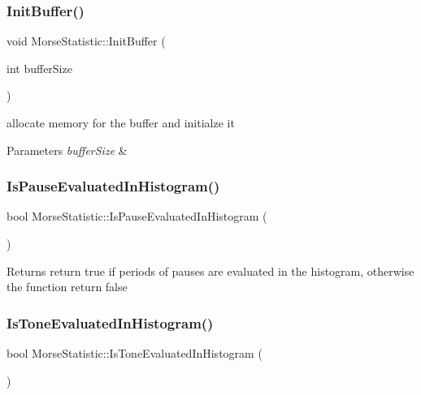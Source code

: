 \subsubsection{\texorpdfstring{Init\+Buffer()}{InitBuffer()}}
{\footnotesize\ttfamily void Morse\+Statistic\+::\+Init\+Buffer (\begin{DoxyParamCaption}\item[{int}]{buffer\+Size }\end{DoxyParamCaption})\hspace{0.3cm}{\ttfamily [private]}}



allocate memory for the buffer and initialze it 


\begin{DoxyParams}{Parameters}
{\em buffer\+Size} & \\
\hline
\end{DoxyParams}
\mbox{\label{classMorseStatistic_a79840d18d8976b85931f150df0a94e11}} 
\subsubsection{\texorpdfstring{Is\+Pause\+Evaluated\+In\+Histogram()}{IsPauseEvaluatedInHistogram()}}
{\footnotesize\ttfamily bool Morse\+Statistic\+::\+Is\+Pause\+Evaluated\+In\+Histogram (\begin{DoxyParamCaption}{ }\end{DoxyParamCaption})}

\begin{DoxyReturn}{Returns}
return true if periods of pauses are evaluated in the histogram, otherwise the function return false 
\end{DoxyReturn}
\mbox{\label{classMorseStatistic_ad2f9a6c81583599830803c8024abc507}} 
\subsubsection{\texorpdfstring{Is\+Tone\+Evaluated\+In\+Histogram()}{IsToneEvaluatedInHistogram()}}
{\footnotesize\ttfamily bool Morse\+Statistic\+::\+Is\+Tone\+Evaluated\+In\+Histogram (\begin{DoxyParamCaption}{ }\end{DoxyParamCaption})}

